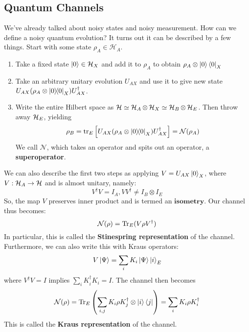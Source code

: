 \subsection{Quantum Channels}
We've already talked about noisy states and noisy measurement. How can we define a noisy quantum evolution? It turns out it can be described by a few things. Start with
some state $\rho_A \in \mathcal{H}_A$.
\begin{enumerate}
    \item Take a fixed state $\ket{0} \in \mathcal{H}_X$ and add it to $\rho_A$ to obtain $\rho_A \otimes \ket{0}\bra{0}_X$
    \item Take an arbitrary unitary evolution $U_{AX}$ and use it to give new state $U_{AX}\qty(\rho_A \otimes \ketbra{0}_X) U_{AX}^{\dagger}$.
    \item Write the entire Hilbert space as $\operatorname{\mathcal{H}} \simeq \operatorname{\mathcal{H}}_A \otimes \operatorname{\mathcal{H}}_X \simeq \operatorname{\mathcal{H}}_B \otimes \operatorname{\mathcal{H}}_E$. Then throw away $\operatorname{\mathcal{H}}_E$, yielding
    \[ \rho_B = \tr_E\qty[U_{AX} (\rho_A \otimes \ketbra{0}_X) U_{AX}^{\dagger}] = \mathcal{N}(\rho_A) \]
    We call $\mathcal{N}$, which takes an operator and spits out an operator, a \textbf{superoperator}.
\end{enumerate}
We can also describe the first two steps as applying $V = U_{AX} \ket{0}_X$, where $V: \operatorname{\mathcal{H}}_A \to \operatorname{\mathcal{H}}$ and is almost unitary, namely:
\[ V^{\dagger} V = I_A, VV^{\dagger} \neq I_B \otimes I_E \]
So, the map $V$ preserves inner product and is termed an $\textbf{isometry}$. Our channel thus becomes:
\[ \mathcal{N}(\rho) = \Tr_E(V \rho V^{\dagger}) \]
In particular, this is called the \textbf{Stinespring representation} of the channel. Furthermore, we can also write this with Kraus operators:
\[ V \ket{\Psi}  = \sum_i K_i \ket{\Psi} \ket{i}_E \]
where $V^{\dagger}V = I$ implies $\sum_i K_i^{\dagger} K_i = I$. The channel then becomes
\[ \mathcal{N}(\rho) = \Tr_E\qty(\sum_{i, j} K_i \rho K_j^{\dagger} \otimes \ket{i}\bra{j}) = \sum_i K_i \rho K_i^{\dagger} \]
This is called the \textbf{Kraus representation} of the channel.

